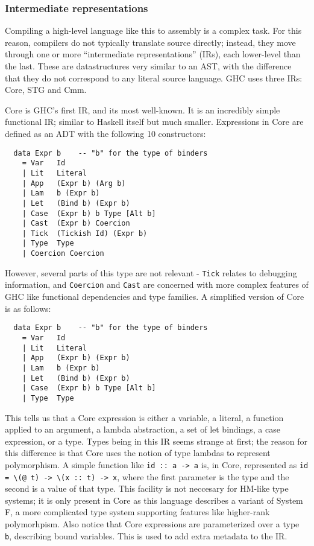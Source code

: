 \documentclass[9pt]{extarticle}
\begin{document}
\subsubsection{Intermediate representations}

Compiling a high-level language like this to assembly is a complex task.
For this reason, compilers do not typically translate source directly;
instead, they move through one or more ``intermediate representations''
(IRs), each lower-level than the last. These are datastructures very
similar to an AST, with the difference that they do not correspond to
any literal source language. GHC uses three IRs: Core, STG and Cmm.

Core is GHC's first IR, and its most well-known. It is an incredibly
simple functional IR; similar to Haskell itself but much smaller.
Expressions in Core are defined as an ADT with the following 10
constructors:

\begin{verbatim}
  data Expr b    -- "b" for the type of binders
    = Var   Id
    | Lit   Literal
    | App   (Expr b) (Arg b)
    | Lam   b (Expr b)
    | Let   (Bind b) (Expr b)
    | Case  (Expr b) b Type [Alt b]
    | Cast  (Expr b) Coercion
    | Tick  (Tickish Id) (Expr b)
    | Type  Type
    | Coercion Coercion
\end{verbatim}

However, several parts of this type are not relevant - \verb'Tick'
relates to debugging information, and \verb'Coercion' and \verb'Cast'
are concerned with more complex features of GHC like functional
dependencies and type families. A simplified version of Core is as
follows:

\begin{verbatim}
  data Expr b    -- "b" for the type of binders
    = Var   Id
    | Lit   Literal
    | App   (Expr b) (Expr b)
    | Lam   b (Expr b)
    | Let   (Bind b) (Expr b)
    | Case  (Expr b) b Type [Alt b]
    | Type  Type
\end{verbatim}

This tells us that a Core expression is either a variable, a literal, a
function applied to an argument, a lambda abstraction, a set of let
bindings, a case expression, or a type. Types being in this IR seems
strange at first; the reason for this difference is that Core uses the
notion of type lambdas to represent polymorphism. A simple function like
\verb'id :: a -> a' is, in Core, represented as
\verb'id = \(@ t) -> \(x :: t) -> x', where the first parameter is the
type and the second is a value of that type. This facility is not
neccesary for HM-like type systems; it is only present in Core as this
language describes a variant of System F, a more complicated type system
supporting features like higher-rank polymorhpism. Also notice that Core
expressions are parameterized over a type \verb'b', describing bound
variables. This is used to add extra metadata to the IR.
\end{document}
